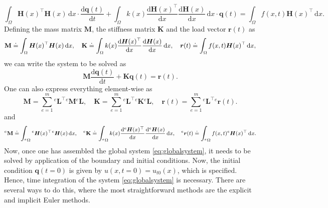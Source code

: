 \documentclass[a4paper,11pt]{article}
\numberwithin{equation}{section}
\newcommand\matr[1]{\ensuremath{\boldsymbol{\mathbf{#1}}}}
\newcommand\vect[1]{\ensuremath{\bm{#1}}}
\begin{document}
{\begin{equation}
\int_{\Omega} \vect{H}(x)^\top \vect{H}(x)\,\mathrm{d}x \cdot \frac{\mathrm{d} \vect{q}(t)}{\mathrm{d} t} + \int_\Omega k(x)\frac{\mathrm{d}\vect{H}(x)^\top}{\mathrm{d}x}\frac{\mathrm{d}\vect{H}(x)}{\mathrm{d}x}\,\mathrm{d}x\cdot \vect{q}(t) = \int_\Omega f(x,t)\vect{H}(x)^\top \,\mathrm{d}x.
\end{equation} Defining the mass matrix $\matr{M}$, the stiffness matrix $\matr{K}$ and the load vector $\vect{r}(t)$ as \begin{align}\small\begin{aligned}
\matr{M} \doteq \int_{\Omega} \vect{H}(x)^\top \vect{H}(x)\,\mathrm{d}x, \quad \matr{K} \doteq \int_\Omega k(x)\frac{\mathrm{d}\vect{H}(x)^\top}{\mathrm{d}x}\frac{\mathrm{d}\vect{H}(x)}{\mathrm{d}x}\,\mathrm{d}x,\quad \vect{r}(t)\doteq \int_\Omega f(x,t)\vect{H}(x)^\top \,\mathrm{d}x, 
\end{aligned}\end{align} we can write the system to be solved as \begin{equation}\label{eq:globalsystem}
\matr{M}\frac{\mathrm{d}\vect{q}(t)}{\mathrm{d}t} + \matr{K}\vect{q}(t) = \vect{r}(t).
\end{equation} One can also express everything element-wise as \begin{equation}
\matr{M} = \sum_{e=1}^m {}^e \matr{L}^\top {}^e \matr{M} {}^e \matr{L}, \quad \matr{K} = \sum_{e=1}^m {}^e \matr{L}^\top {}^e \matr{K} {}^e \matr{L}, \quad \vect{r}(t) = \sum_{e=1}^{m}{}^e \matr{L}^\top {}^e \vect{r}(t).
\end{equation} and 
\begin{align}\footnotesize\begin{aligned}
		{}^e \matr{M} \doteq \int_{{}^e\Omega} {}^e\vect{H}(x)^\top {}^e\vect{H}(x)\,\mathrm{d}x, \quad {}^e\matr{K} \doteq \int_{{}^e\Omega} k(x)\frac{\mathrm{d}{}^e\vect{H}(x)^\top}{\mathrm{d}x}\frac{\mathrm{d}{}^e\vect{H}(x)}{\mathrm{d}x}\,\mathrm{d}x,\quad {}^e\vect{r}(t)\doteq \int_{{}^e\Omega} f(x,t){}^e\vect{H}(x)^\top \,\mathrm{d}x.
\end{aligned}\end{align}
Now, once one has assembled the global system \cref{eq:globalsystem}, it needs to be solved by application of the boundary and initial conditions. Now, the initial condition $\vect{q}(t=0)$ is given by $u(x,t=0) = u_{t0}(x)$, which is specified. Hence, time integration of the system \cref{eq:globalsystem} is necessary. There are several ways to do this, where the most straightforward methods are the explicit and implicit Euler methods.

}
\end{document}
